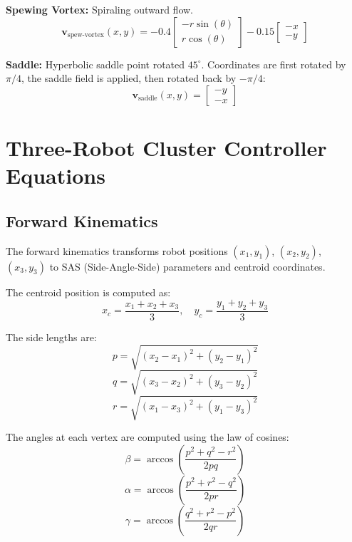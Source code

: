 \documentclass[lettersize,journal]{IEEEtran}
\begin{document}
\textbf{Spewing Vortex:} Spiraling outward flow.
\begin{equation}
\mathbf{v}_{\text{spew-vortex}}(x, y) = -0.4 \begin{bmatrix} -r \sin(\theta) \\ r \cos(\theta) \end{bmatrix} - 0.15 \begin{bmatrix} -x \\ -y \end{bmatrix}
\end{equation}

\textbf{Saddle:} Hyperbolic saddle point rotated $45^\circ$. Coordinates are first rotated by $\pi/4$, the saddle field is applied, then rotated back by $-\pi/4$:
\begin{equation}
\mathbf{v}_{\text{saddle}}(x, y) = \begin{bmatrix} -y \\ -x \end{bmatrix}
\end{equation}

\section{Three-Robot Cluster Controller Equations}

\subsection{Forward Kinematics}

The forward kinematics transforms robot positions $(x_1, y_1)$, $(x_2, y_2)$, $(x_3, y_3)$ to SAS (Side-Angle-Side) parameters and centroid coordinates.

The centroid position is computed as:
\begin{equation}
x_c = \frac{x_1 + x_2 + x_3}{3}, \quad y_c = \frac{y_1 + y_2 + y_3}{3}
\end{equation}

The side lengths are:
\begin{equation}
p = \sqrt{(x_2 - x_1)^2 + (y_2 - y_1)^2}
\end{equation}
\begin{equation}
q = \sqrt{(x_3 - x_2)^2 + (y_3 - y_2)^2}
\end{equation}
\begin{equation}
r = \sqrt{(x_1 - x_3)^2 + (y_1 - y_3)^2}
\end{equation}

The angles at each vertex are computed using the law of cosines:
\begin{equation}
\beta = \arccos\left(\frac{p^2 + q^2 - r^2}{2pq}\right)
\end{equation}
\begin{equation}
\alpha = \arccos\left(\frac{p^2 + r^2 - q^2}{2pr}\right)
\end{equation}
\begin{equation}
\gamma = \arccos\left(\frac{q^2 + r^2 - p^2}{2qr}\right)
\end{equation}
\end{document}
